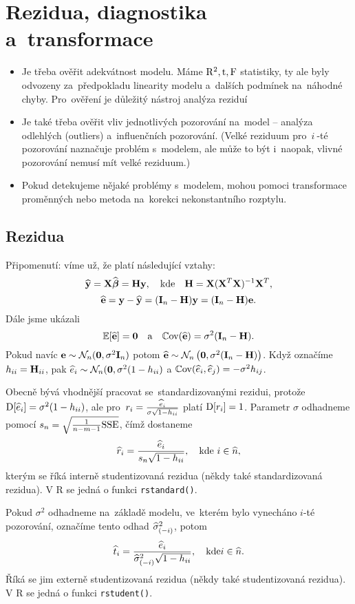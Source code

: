 \chapter{Rezidua, diagnostika a~transformace}
\begin{itemize}
 \item Je třeba ověřit adekvátnost modelu. Máme $\mathrm{R}^2, \mathrm{t}, \text{F}$ statistiky, ty ale byly odvozeny za~předpokladu linearity modelu a~dalších podmínek na~náhodné chyby. Pro~ověření je důležitý nástroj analýza reziduí
 \item Je také třeba ověřit vliv jednotlivých pozorování na~model -- analýza odlehlých (outliers) a~influenčních pozorování. (Velké reziduum pro~$i~$-té pozorování naznačuje problém s~modelem, ale může to být i~naopak, vlivné pozorování nemusí mít velké reziduum.)
 \item Pokud detekujeme nějaké problémy s~modelem, mohou pomoci transformace proměnných nebo metoda na~korekci nekonstantního rozptylu.
\end{itemize}
\section{Rezidua}
Připomenutí: víme už, že platí následující vztahy:
 $$
 \widehat{\mathbf{y}} = \mathbf{X} \widehat{\boldsymbol{\beta}} = \textbf{H} \mathbf{y}, \quad \text{kde} \quad \textbf{H} = \mathbf{X} (\mathbf{X}^T \mathbf{X})^{-1} \mathbf{X}^T,
 $$
 $$
 \widehat{\mathbf{e}} = \mathbf{y} - \widehat{\mathbf{y}} = (\textbf{I}_{n} - \textbf{H}) \mathbf{y} = (\textbf{I}_{n} - \textbf{H}) \mathbf{e}.
 $$
Dále jsme ukázali
 $$
\mathbb{E} [\widehat{\mathbf{e}}] = \boldsymbol{0} \quad \text{a} \quad \mathbb{C}\mathrm{ov}(\widehat{\mathbf{e}}) = \sigma^2 (\textbf{I}_{n} - \textbf{H}).
 $$
Pokud navíc
$\mathbf{e} \sim \mathcal{N}_n (\boldsymbol{0},\sigma^2 \textbf{I}_{n})$ potom $\widehat{\mathbf{e}} \sim \mathcal{N}_n \left(\boldsymbol{0},\sigma^2 (\textbf{I}_{n} - \textbf{H})\right)$. Když označíme $h_{ii} = \textbf{H}_{ii} $, pak $ \widehat{e}_i \sim \mathcal{N}_n (\boldsymbol{0}, \sigma^2 (1 - h_{ii}) $ a $ \mathbb{C}\mathrm{ov}(\widehat{e}_i, \widehat{e}_j) = -\sigma^2 h_{ij} $.

Obecně bývá vhodnější pracovat se~standardizovanými rezidui, protože $\mathrm{D} [\widehat{e}_i] = \sigma^2 (1 - h_{ii})$, ale pro~$r_i = \frac{\widehat{e}_i}{\sigma \sqrt{1-h_{ii}}}$ platí $\mathrm{D} [r_i] = 1$.
 Parametr $\sigma$ odhadneme pomocí $s_n = \sqrt{\frac{1}{n-m-1} \mathrm{SSE}}$, čímž dostaneme
 $$
  \widehat{r}_i = \frac{\widehat{e}_i}{s_n \sqrt{1 - h_{ii}}}, \quad \text{kde }  i\in\widehat{n},
 $$
kterým se říká interně studentizovaná rezidua (někdy také standardizovaná rezidua). V R se jedná o funkci \verb|rstandard()|.

Pokud $\sigma^2$ odhadneme na~základě modelu, ve~kterém bylo vynecháno $i$-té pozorování, označíme tento odhad $\widehat{\sigma}^2_{(-i)}$, potom
 $$
 \widehat{t}_i = \frac{\widehat{e}_i}{  \widehat{\sigma}^2_{(-i)} \sqrt{1 - h_{ii}}}, \quad \text{kde} i\in\widehat{n}.
 $$
 Říká se jim externě studentizovaná rezidua (někdy také studentizovaná rezidua). V R se jedná o funkci \verb|rstudent()|.
 
